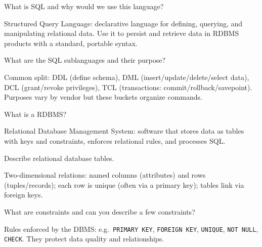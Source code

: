



\question[4]
What is SQL and why would we use this language?
\begin{solutionorbox}[1.25in]
  Structured Query Language: declarative language for defining, querying, and manipulating relational data. Use it to persist and retrieve data in RDBMS products with a standard, portable syntax.
\end{solutionorbox}

\question[4]
What are the SQL sublanguages and their purpose?
\begin{solutionorbox}[1.45in]
  Common split: DDL (define schema), DML (insert/update/delete/select data), DCL (grant/revoke privileges), TCL (transactions: commit/rollback/savepoint). Purposes vary by vendor but these buckets organize commands.
\end{solutionorbox}

\question[4]
What is a RDBMS?
\begin{solutionorbox}[1.05in]
  Relational Database Management System: software that stores data as tables with keys and constraints, enforces relational rules, and processes SQL.
\end{solutionorbox}

\question[4]
Describe relational database tables.
\begin{solutionorbox}[1.25in]
  Two-dimensional relations: named columns (attributes) and rows (tuples/records); each row is unique (often via a primary key); tables link via foreign keys.
\end{solutionorbox}

\question[4]
What are constraints and can you describe a few constraints?
\begin{solutionorbox}[1.45in]
  Rules enforced by the DBMS: e.g.\ \texttt{PRIMARY KEY}, \texttt{FOREIGN KEY}, \texttt{UNIQUE}, \texttt{NOT NULL}, \texttt{CHECK}. They protect data quality and relationships.
\end{solutionorbox}

